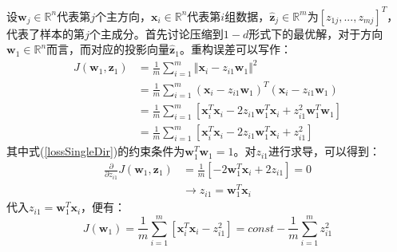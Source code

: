 \documentclass[UTF8, 12pt]{ctexart}
\begin{document}
	设$\textbf{w}_{j} \in \mathbb{R}^{n}$代表第$j$个主方向，$\textbf{x}_{i} \in \mathbb{R}^{n}$代表第$i$组数据，$\hat{\textbf{z}}_{j} \in \mathbb{R}^{m}$为$[z_{1j}, ..., z_{mj}]^{T}$，代表了样本的第$j$个主成分。首先讨论压缩到$1-d$形式下的最优解，对于方向$\textbf{w}_{1} \in \mathbb{R}^{n}$而言，而对应的投影向量$\hat{\textbf{z}}_{1}$。重构误差可以写作：
	\begin{align}
		\label{lossSingleDir}
		J(\textbf{w}_{1}, \textbf{z}_{1}) & = \frac{1}{m} \sum_{i=1}^{m} {\Vert \textbf{x}_{i} - z_{i1}\textbf{w}_1 \Vert}^{2} \\
					   					  & = \frac{1}{m} \sum_{i=1}^{m} {(\textbf{x}_{i} - z_{i1}\textbf{w}_1)}^{T}(\textbf{x}_{i} - z_{i1}\textbf{w}_1) \\
					   					  & = \frac{1}{m} \sum_{i=1}^{m} [\textbf{x}_{i}^{T}\textbf{x}_{i} - 2 z_{i1}\textbf{w}_{1}^{T}\textbf{x}_{i} + z_{i1}^{2}\textbf{w}_{1}^{T}\textbf{w}_{1}] \\
					   					  & = \frac{1}{m} \sum_{i=1}^{m} [\textbf{x}_{i}^{T}\textbf{x}_{i} - 2 z_{i1}\textbf{w}_{1}^{T}\textbf{x}_{i} + z_{i1}^{2}]
	\end{align}
	其中式(\ref{lossSingleDir})的约束条件为$\textbf{w}_{1}^{T}\textbf{w}_{1}=1$。对$z_{i1}$进行求导，可以得到：
	\begin{align}
		\frac{\partial}{\partial z_{i1}}J(\textbf{w}_1, \textbf{z}_1) & = \frac{1}{m} [-2\textbf{w}_{1}^{T}\textbf{x}_{i} + 2z_{i1}] = 0 \\
													& \to z_{i1} = \textbf{w}^{T}_{1}\textbf{x}_{i}
	\end{align}
	代入$z_{i1} = \textbf{w}^{T}_{1}\textbf{x}_{i}$，便有：
	\begin{equation}
		J(\textbf{w}_{1}) = \frac{1}{m} \sum_{i=1}^{m} [\textbf{x}_{i}^{T}\textbf{x}_{i} - z_{i1}^{2}] = const - \frac{1}{m}\sum_{i=1}^{m} z_{i1}^{2}
	\end{equation}
\end{document}
